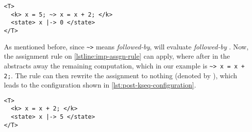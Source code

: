 \begin{lstlisting}[float=h!,language=k,style=ksty,frame=single,label=lst:kseq-configuration,caption={Configuration
Containing \inlinek{\~>} (\emph{followed-by})}]
<T>
  <k> x = 5; ~> x = x + 2; </k>
  <state> x |-> 0 </state>
</T>
\end{lstlisting}

As mentioned before, since \lstinline[style=ksty]{~>} means
\emph{followed-by}, \K{} will evaluate 
\emph{followed-by} . Now, the assignment
rule on \autoref{lstline:imp-assgn-rule} can apply,
where  after  in the 
abstracts away the remaining computation, which in our example
is \lstinline[style=ksty]{~> x = x + 2;}. The rule can then
rewrite the assignment  to nothing (denoted by
), which leads to the configuration shown in
\autoref{lst:post-kseq-configuration}.

\begin{lstlisting}[float=h!,language=k,style=ksty,frame=single,label=lst:post-kseq-configuration,caption={Configuration Post
\inlinek{\~>} (\emph{followed-by}) Evaluation}]
<T>
  <k> x = x + 2; </k>
  <state> x |-> 5 </state>
</T>
\end{lstlisting}

